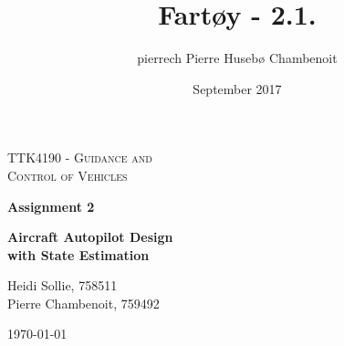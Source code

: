 \documentclass[12pt,a4paper]{article}
\title{Fartøy - 2.1.}
\author{pierrech Pierre Husebø Chambenoit}
\date{September 2017}
\begin{document}
\begin{titlepage}
	\centering
	\vspace{1cm}
	{\scshape\Large TTK4190 - Guidance and \\Control of Vehicles\par}
	\vspace{1.5cm}
	{\huge\bfseries Assignment 2\par}
	\vspace{0.25cm}
	{\Large\bfseries Aircraft Autopilot Design \\with State Estimation\par}
	\vspace{2cm}
	{\Large Heidi Sollie, 758511\\Pierre Chambenoit, 759492\par}
    \vfill
	{\large \today\par}
\end{titlepage}

\newpage
\setcounter{page}{1}












\newpage
\printbibliography
\end{document}
